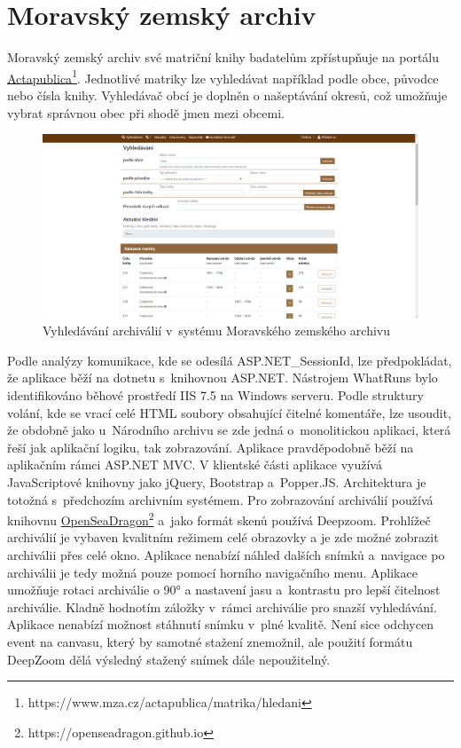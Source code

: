 \section{Moravský zemský archiv}
Moravský zemský archiv své matriční knihy badatelům zpřístupňuje na portálu \href{https://www.mza.cz/actapublica/matrika/hledani}{Actapublica}\footnote{https://www.mza.cz/actapublica/matrika/hledani}. Jednotlivé matriky lze vyhledávat například podle obce, původce nebo čísla knihy. Vyhledávač obcí je doplněn o našeptávání okresů, což umožňuje vybrat správnou obec při shodě jmen mezi obcemi.

\begin{figure}[htbp]
\centering
    \includegraphics[scale=.2]{obrazky-figures/archives/mza/vyhledani.png}
    \caption{Vyhledávání archiválií v~systému Moravského zemského archivu}
\end{figure}
\newpage

\noindent
Podle analýzy komunikace, kde se odesílá ASP.NET\_SessionId, lze předpokládat, že aplikace běží na dotnetu s~knihovnou ASP.NET. Nástrojem WhatRuns bylo identifikováno běhové prostředí IIS 7.5 na Windows serveru. Podle struktury volání, kde se vrací celé HTML soubory obsahující čitelné komentáře, lze usoudit, že obdobně jako u~Národního archivu se zde jedná o~monolitickou aplikaci, která řeší jak aplikační logiku, tak zobrazování. Aplikace pravděpodobně běží na aplikačním rámci ASP.NET MVC. V klientské části aplikace využívá JavaScriptové knihovny jako jQuery, Bootstrap a~Popper.JS. Architektura je totožná s~předchozím archivním systémem. Pro zobrazování archiválií používá knihovnu \href{https://openseadragon.github.io/}{OpenSeaDragon}\footnote{https://openseadragon.github.io} a~jako formát skenů používá Deepzoom.
\newpara
 Prohlížeč archiválií je vybaven kvalitním režimem celé obrazovky a je zde možné zobrazit archiválii přes celé okno. Aplikace nenabízí náhled dalších snímků a~navigace po archiválii je tedy možná pouze pomocí horního navigačního menu. Aplikace umožňuje rotaci archiválie o 90° a nastavení jasu a~kontrastu pro lepší čitelnost archiválie. Kladně hodnotím záložky v~rámci archiválie pro snazší vyhledávání. Aplikace nenabízí možnost stáhnutí snímku v~plné kvalitě. Není sice odchycen event na canvasu, který by samotné stažení znemožnil, ale použití formátu DeepZoom dělá výsledný stažený snímek dále nepoužitelný. 

